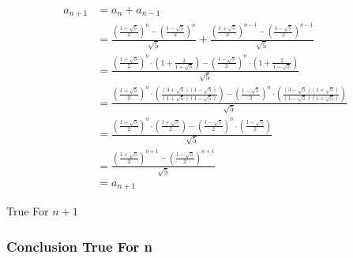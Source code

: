\begin{align*}
a_{n+1} &= a_{n} + a_{n-1} \\[0.3cm]
&= \frac{\left(\frac{1+\sqrt{5}}{2}\right)^n - \left(\frac{1-\sqrt{5}}{2}\right)^n}{\sqrt{5}}+ \frac{\left(\frac{1+\sqrt{5}}{2}\right)^{n-1} - \left(\frac{1-\sqrt{5}}{2}\right)^{n-1}}{\sqrt{5}}\\[0.3cm]
&= \frac{\left(\frac{1+\sqrt{5}}{2}\right)^{n} \cdot   \left(1 + \frac{2}{1+\sqrt{5}}\right)    -  \left(\frac{1-\sqrt{5}}{2}\right)^{n} \cdot \left(1 + \frac{2}{1-\sqrt{5}}\right)}{\sqrt{5}}\\[0.3cm]
&=\frac{\left(\frac{1+\sqrt{5}}{2}\right)^{n} \cdot   \left(\frac{(3+\sqrt{5})(1-\sqrt{5})}{(1+\sqrt{5})(1-\sqrt{5})}\right)    -  \left(\frac{1-\sqrt{5}}{2}\right)^{n} \cdot \left(\frac{(3-\sqrt{5})(1+\sqrt{5})}{(1-\sqrt{5})(1+\sqrt{5})}\right)}{\sqrt{5}}\\[0.3cm] 
&=\frac{\left(\frac{1+\sqrt{5}}{2}\right)^{n} \cdot   \left(\frac{1+\sqrt{5}}{2}\right)    -  \left(\frac{1-\sqrt{5}}{2}\right)^{n} \cdot \left(\frac{1-\sqrt{5}}{2}\right)}{\sqrt{5}}\\[0.3cm]
&= \frac{\left(\frac{1+\sqrt{5}}{2}\right)^{n+1} - \left(\frac{1-\sqrt{5}}{2}\right)^{n+1}}{\sqrt{5}}\\[0.2cm]
&= a_{n+1}
\end{align*}


True For \(n+1\)

\subsubsection*{Conclusion True For n}
